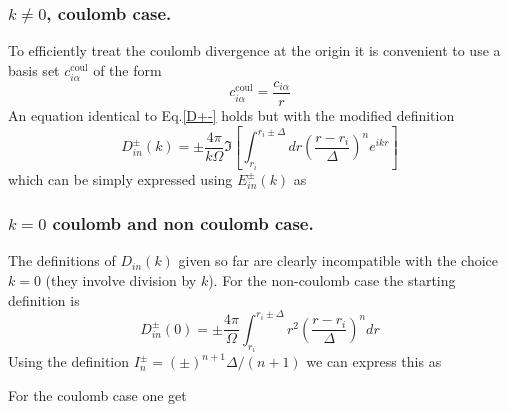 \documentclass{revtex4}
\begin{document}
\subsubsection*{$k\ne 0$, coulomb case.}
To efficiently treat the coulomb divergence at the origin it is convenient to use
a basis set $c_{i\alpha}^\text{coul}$ of the form 
\begin{equation}
c_{i\alpha}^\text{coul}=\frac{c_{i\alpha}}{r}
\end{equation}
An equation identical to Eq.\ref{D+-} holds but with the modified definition
\begin{equation}
D_{in}^\pm(k)=\pm\frac{4\pi}{k\Omega}\Im\left[\int_{r_i}^{r_i\pm\Delta}
dr\left(\frac{r-r_i}{\Delta}\right)^n e^{ikr}\right]
\end{equation}
which can be simply expressed using $E^\pm_{in}(k)$ as
\vskip 3mm
\begin{center}
\end{center}
\vskip 3mm
\subsubsection*{$k=0$ coulomb and non coulomb case.}
The definitions of $D_{in}(k)$ given so far are clearly incompatible 
with the choice $k=0$ (they involve division by $k$). For the non-coulomb
case the starting definition is
\begin{equation}
D^\pm_{in}(0)=\pm\frac{4\pi}{\Omega}\int_{r_i}^{r_i\pm\Delta}r^2
\left(\frac{r-r_i}{\Delta}\right)^ndr
\end{equation}
Using the definition $I_n^\pm=(\pm)^{n+1}\Delta/(n+1)$ we can express this
as
\begin{center}
\vskip 3mm
\end{center}
\vskip 3mm
For the coulomb case one get

\vskip 3mm
\begin{center}
\end{center}
\vskip 3mm
\end{document}
